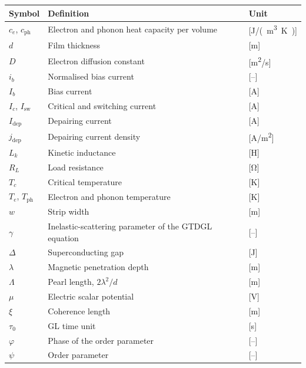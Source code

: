 \begin{longtable}{p{2.5cm}p{8cm}p{2.5cm}}
    \toprule
    Symbol & Definition & Unit \\
    \midrule\endhead %
    $c_e$, $c_\mathrm{ph}$ & Electron and phonon heat capacity per volume & [\unit{J/(m^3.K)}] \\
    $d$ & Film thickness & [\unit{m}] \\
    $D$ & Electron diffusion constant & [\unit{m^2/s}] \\
    $i_b$ & Normalised bias current & [--] \\
    $I_b$ & Bias current & [\unit{A}] \\
    $I_c$, $I_\mathrm{sw}$ & Critical and switching current & [\unit{A}] \\
    $I_\mathrm{dep}$ & Depairing current & [\unit{A}] \\
    $j_\mathrm{dep}$ & Depairing current density & [\unit{A/m^2}] \\
    $L_k$ & Kinetic inductance & [\unit{H}] \\
    $R_L$ & Load resistance & [\unit{\ohm}] \\
    $T_c$ & Critical temperature & [\unit{K}] \\
    $T_e$, $T_\mathrm{ph}$ & Electron and phonon temperature & [\unit{K}] \\
    $w$ & Strip width & [\unit{m}] \\
    \midrule %
    $\gamma$ & Inelastic-scattering parameter of the GTDGL equation & [--] \\
    $\Delta$ & Superconducting gap & [\unit{J}] \\
    $\lambda$ & Magnetic penetration depth & [\unit{m}] \\
    $\Lambda$ & Pearl length, $2\lambda^2/d$ & [\unit{m}] \\
    $\mu$ & Electric scalar potential & [\unit{V}] \\
    $\xi$ & Coherence length & [\unit{m}] \\
    $\tau_0$ & GL time unit & [\unit{s}] \\
    $\varphi$ & Phase of the order parameter & [--] \\
    $\psi$ & Order parameter & [--] \\
    \bottomrule
\end{longtable}
